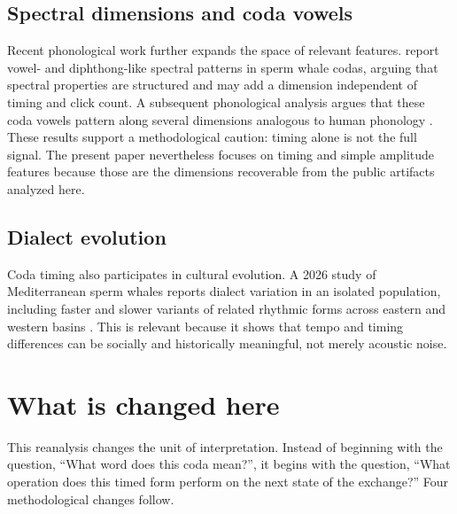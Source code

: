 \documentclass[11pt]{article}
\begin{document}
\subsection{Spectral dimensions and coda vowels}

Recent phonological work further expands the space of relevant features. \citet{begus2025vowels} report vowel- and diphthong-like spectral patterns in sperm whale codas, arguing that spectral properties are structured and may add a dimension independent of timing and click count. A subsequent phonological analysis argues that these coda vowels pattern along several dimensions analogous to human phonology \citep{begus2026phonology}. These results support a methodological caution: timing alone is not the full signal. The present paper nevertheless focuses on timing and simple amplitude features because those are the dimensions recoverable from the public artifacts analyzed here.

\subsection{Dialect evolution}

Coda timing also participates in cultural evolution. A 2026 study of Mediterranean sperm whales reports dialect variation in an isolated population, including faster and slower variants of related rhythmic forms across eastern and western basins \citep{hersh2026mediterranean}. This is relevant because it shows that tempo and timing differences can be socially and historically meaningful, not merely acoustic noise.

\section{What is changed here}

This reanalysis changes the unit of interpretation. Instead of beginning with the question, ``What word does this coda mean?'', it begins with the question, ``What operation does this timed form perform on the next state of the exchange?'' Four methodological changes follow.
\end{document}
